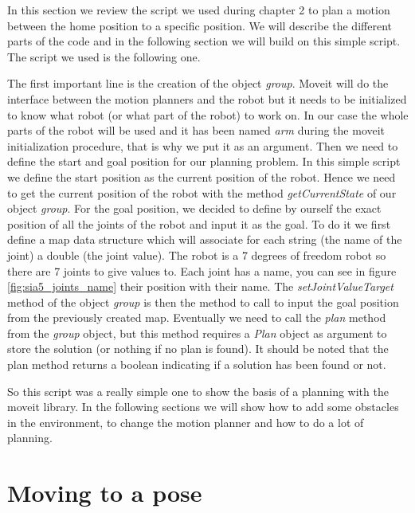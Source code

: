 In this section we review the script we used during chapter 2 to plan a motion between the home position to a specific position. We will describe the different parts of the code and in the following section we will build on this simple script. The script we used is the following one.



The first important line is the creation of the object \emph{group}. Moveit will do the interface between the motion planners and the robot but it needs to be initialized to know what robot (or what part of the robot) to work on. In our case the whole parts of the robot will be used and it has been named \emph{arm} during the moveit initialization procedure, that is why we put it as an argument. Then we need to define the start and goal position for our planning problem. In this simple script we define the start position as the current position of the robot. Hence we need to get the current position of the robot with the method \emph{getCurrentState} of our object \emph{group}. For the goal position, we decided to define by ourself the exact position of all the joints of the robot and input it as the goal. To do it we first define a map data structure which will associate for each string (the name of the joint) a double (the joint value). The robot is a 7 degrees of freedom robot so there are 7 joints to give values to. Each joint has a name, you can see in figure \ref{fig:sia5_joints_name} their position with their name. The \emph{setJointValueTarget} method of the object \emph{group} is then the method to call to input the goal position from the previously created map. Eventually we need to call the \emph{plan} method from the \emph{group} object, but this method requires a \emph{Plan} object as argument to store the solution (or nothing if no plan is found). It should be noted that the plan method returns a boolean indicating if a solution has been found or not.

So this script was a really simple one to show the basis of a planning with the moveit library. In the following sections we will show how to add some obstacles in the environment, to change the motion planner and how to do a lot of planning.


\section{Moving to a pose}

